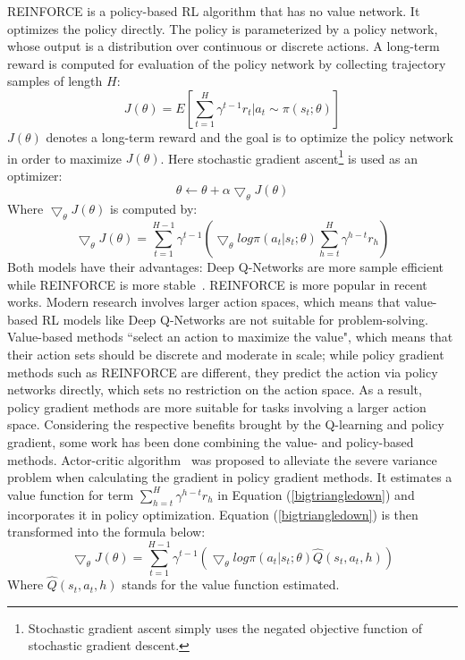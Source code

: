 REINFORCE is a policy-based RL algorithm that has no value network. It optimizes the policy directly. The policy is parameterized by a policy network, whose output is a distribution over continuous or discrete actions. A long-term reward is computed for evaluation of the policy network by collecting trajectory samples of length $H$: 
\begin{equation}
J(\theta) = E \left[ \sum_{t=1}^{H}\gamma^{t-1}r_t|a_t \sim \pi(s_t;\theta) \right]
\end{equation}
$J(\theta)$ denotes a long-term reward and the goal is to optimize the policy network in order to maximize $J(\theta)$. Here stochastic gradient ascent\footnote{Stochastic gradient ascent simply uses the negated objective function of stochastic gradient descent.} is used as an optimizer: 
\begin{equation}
\theta \leftarrow \theta + \alpha \bigtriangledown_{\theta}J(\theta)
\end{equation}
Where $\bigtriangledown_{\theta}J(\theta)$ is computed by: 
\begin{equation}
\bigtriangledown_{\theta}J(\theta) = \sum_{t=1}^{H-1}\gamma^{t-1}\left(\bigtriangledown_{\theta}log\pi(a_t|s_t; \theta) \sum_{h=t}^{H}\gamma^{h-t}r_h \right)
\label{bigtriangledown}
\end{equation} 
Both models have their advantages: Deep Q-Networks are more sample efficient while REINFORCE is more stable~. REINFORCE is more popular in recent works. Modern research involves larger action spaces, which means that value-based RL models like Deep Q-Networks are not suitable for problem-solving. Value-based methods ``select an action to maximize the value", which means that their action sets should be discrete and moderate in scale; while policy gradient methods such as REINFORCE are different, they predict the action via policy networks directly, which sets no restriction on the action space. As a result, policy gradient methods are more suitable for tasks involving a larger action space. 
Considering the respective benefits brought by the Q-learning and policy gradient, some work has been done combining the value- and policy-based methods. Actor-critic algorithm~ was proposed to alleviate the severe variance problem when calculating the gradient in policy gradient methods. It estimates a value function for term $\sum_{h=t}^{H}\gamma^{h-t}r_h$ in Equation (\ref{bigtriangledown}) and incorporates it in policy optimization. Equation (\ref{bigtriangledown}) is then transformed into the formula below:
\begin{equation}
\bigtriangledown_{\theta}J(\theta) = \sum_{t=1}^{H-1}\gamma^{t-1}\left(\bigtriangledown_{\theta}log\pi(a_t|s_t; \theta) \hat{Q}(s_t, a_t, h) \right)
\end{equation} 
Where $\hat{Q}(s_t, a_t, h)$ stands for the value function estimated.

